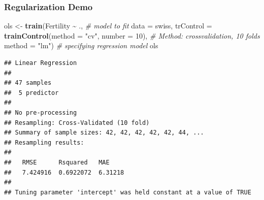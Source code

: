 \documentclass[
  shownotes,
  xcolor={svgnames},
  hyperref={colorlinks,citecolor=DarkBlue,linkcolor=DarkRed,urlcolor=DarkBlue}
  , aspectratio=169]{beamer}
\newenvironment{Shaded}{\begin{snugshade}}{\end{snugshade}}
\newcommand{\CommentTok}[1]{\textcolor[rgb]{0.56,0.35,0.01}{\textit{#1}}}
\newcommand{\DataTypeTok}[1]{\textcolor[rgb]{0.13,0.29,0.53}{#1}}
\newcommand{\DecValTok}[1]{\textcolor[rgb]{0.00,0.00,0.81}{#1}}
\newcommand{\KeywordTok}[1]{\textcolor[rgb]{0.13,0.29,0.53}{\textbf{#1}}}
\newcommand{\NormalTok}[1]{#1}
\newcommand{\OperatorTok}[1]{\textcolor[rgb]{0.81,0.36,0.00}{\textbf{#1}}}
\newcommand{\StringTok}[1]{\textcolor[rgb]{0.31,0.60,0.02}{#1}}
\begin{document}
\begin{frame}[fragile]
\frametitle{Regularization Demo}

\begin{scriptsize}
\begin{Shaded}
\begin{Highlighting}[]
\NormalTok{ols \textless{}{-}}\StringTok{ }\KeywordTok{train}\NormalTok{(Fertility }\OperatorTok{\textasciitilde{}}\StringTok{ }\NormalTok{.,   }\CommentTok{\# model to fit}
                     \DataTypeTok{data =}\NormalTok{ swiss,                        }
                     \DataTypeTok{trControl =} \KeywordTok{trainControl}\NormalTok{(}\DataTypeTok{method =} \StringTok{"cv"}\NormalTok{, }\DataTypeTok{number =} \DecValTok{10}\NormalTok{),     }\CommentTok{\# Method: crossvalidation, 10 folds}
                     \DataTypeTok{method =} \StringTok{"lm"}\NormalTok{)                      }\CommentTok{\# specifying regression model}
\NormalTok{ols}
\end{Highlighting}
\end{Shaded}
\end{scriptsize}
\begin{tiny}
\begin{verbatim}
## Linear Regression 
## 
## 47 samples
##  5 predictor
## 
## No pre-processing
## Resampling: Cross-Validated (10 fold) 
## Summary of sample sizes: 42, 42, 42, 42, 42, 44, ... 
## Resampling results:
## 
##   RMSE      Rsquared   MAE    
##   7.424916  0.6922072  6.31218
## 
## Tuning parameter 'intercept' was held constant at a value of TRUE
\end{verbatim}
\end{tiny}
\end{frame}
\end{document}
